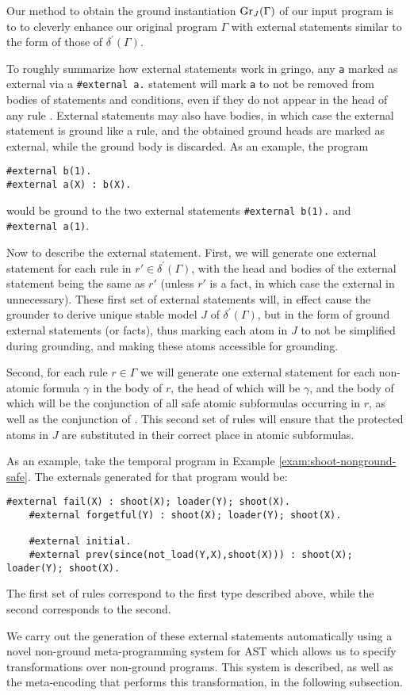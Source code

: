 Our method to obtain the ground instantiation $\operatorname{Gr}_{J}(\Gamma)$ of
our input program is to to cleverly enhance our original program
$\Gamma$ with external statements similar to the form of those of
$\delta^\prime(\Gamma)$.

To roughly summarize how external statements work in gringo, any
\verb|a| marked as external via a \verb|#external a.| statement will
mark \verb|a| to not be removed from bodies of statements and
conditions, even if they do not appear in the head of any rule
\cite{PotasscoUserGuide19}. External statements may also have bodies,
in which case the external statement is ground like a rule, and the
obtained ground heads are marked as external, while the ground body is
discarded. As an example, the program
\begin{lstlisting}[language=clingo]
#external b(1).
#external a(X) : b(X).
\end{lstlisting}
would be ground to the two external statements \verb|#external b(1).|
and \\\verb|#external a(1)|.

Now to describe the external statement. First, we will generate one
external statement for each rule in $r' \in \delta^\prime(\Gamma)$,
with the head and bodies of the external statement being the same as
$r'$ (unless $r'$ is a fact, in which case the external in
unnecessary). These first set of external statements will, in effect
cause the grounder to derive unique stable model $J$ of
$\delta^\prime(\Gamma)$, but in the form of ground external statements
(or facts), thus marking each atom in $J$ to not be simplified during
grounding, and making these atoms accessible for grounding.

Second, for each rule $r \in \Gamma$ we will generate one external
statement for each non-atomic formula $\gamma$ in the body of $r$, the
head of which will be $\gamma$, and the body of which will be the
conjunction of all safe atomic subformulas occurring in $r$, as well
as the conjunction of . This second set of rules will ensure that the
protected atoms in $J$ are substituted in their correct place in
atomic subformulas.

\begin{example}
  As an example, take the temporal program in Example
  \ref{exam:shoot-nonground-safe}. The externals generated for that program would be:
  \begin{lstlisting}[numbers=none]
    #external fail(X) : shoot(X); loader(Y); shoot(X).
    #external forgetful(Y) : shoot(X); loader(Y); shoot(X).

    #external initial.
    #external prev(since(not_load(Y,X),shoot(X))) : shoot(X); loader(Y); shoot(X).
  \end{lstlisting}
  The first set of rules correspond to the first type described above,
  while the second corresponds to the second.
\end{example}


We carry out the generation of these external statements automatically
using a novel non-ground meta-programming system for AST which allows
us to specify transformations over non-ground programs. This system is
described, as well as the meta-encoding that performs this
transformation, in the following subsection.
